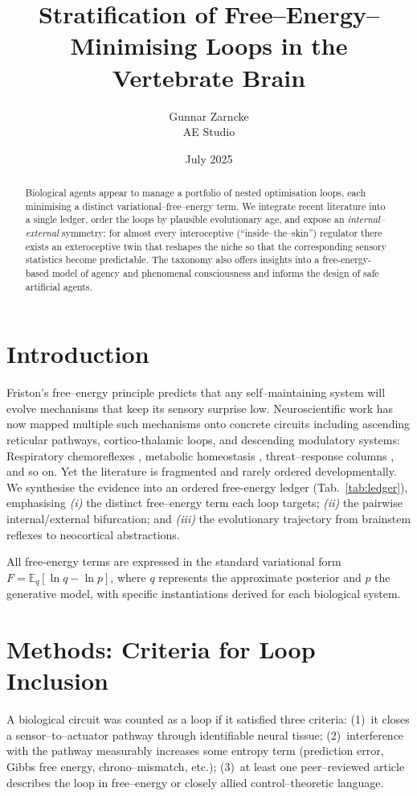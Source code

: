 \documentclass[11pt]{article}
\title{Stratification of Free--Energy--Minimising Loops in the Vertebrate Brain}
\author{Gunnar Zarncke\\
AE Studio}
\date{July 2025}
\begin{document}
\maketitle

\begin{abstract}
Biological agents appear to manage a portfolio of nested optimisation loops, each minimising a distinct variational--free--energy term.  
We integrate recent literature into a single ledger, order the loops by plausible evolutionary age, and expose an \emph{internal--external} symmetry: 
for almost every interoceptive (``inside--the--skin'') regulator there exists an exteroceptive twin 
that reshapes the niche so that the corresponding sensory statistics become predictable.  
The taxonomy also offers insights into a free-energy-based model of agency and phenomenal consciousness and informs the design of safe artificial agents.
\end{abstract}

\section{Introduction}
Friston's free--energy principle \cite{friston2010free} predicts that any self--maintaining system will evolve mechanisms that keep its sensory surprise low.  
Neuroscientific work has now mapped multiple such mechanisms onto concrete circuits including ascending reticular pathways, cortico-thalamic loops, and descending modulatory systems: 
Respiratory chemoreflexes \cite{guyenet2015co2}, 
metabolic homeostasis \cite{karraza2024metabolic}, 
threat--response columns \cite{zhang2023pag}, and so on.  
Yet the literature is fragmented and rarely ordered developmentally.  
We synthesise the evidence into an ordered free-energy ledger (Tab.~\ref{tab:ledger}), emphasising 
\emph{(i)} the distinct free--energy term each loop targets; 
\emph{(ii)} the pairwise internal/external bifurcation; and 
\emph{(iii)} the evolutionary trajectory from brainstem reflexes to neocortical abstractions.

All free-energy terms are expressed in the standard variational form $F = \mathbb{E}_q[\ln q - \ln p]$, where $q$ represents the approximate posterior and $p$ the generative model, with specific instantiations derived for each biological system.

\section{Methods: Criteria for Loop Inclusion}
A biological circuit was counted as a loop if it satisfied three criteria: 
(1)\ it closes a sensor--to--actuator pathway through identifiable neural tissue; 
(2)\ interference with the pathway measurably increases some entropy term (prediction error, Gibbs free energy, chrono--mismatch, etc.); 
(3)\ at least one peer--reviewed article describes the loop in free--energy or closely allied control--theoretic language.
\end{document}
